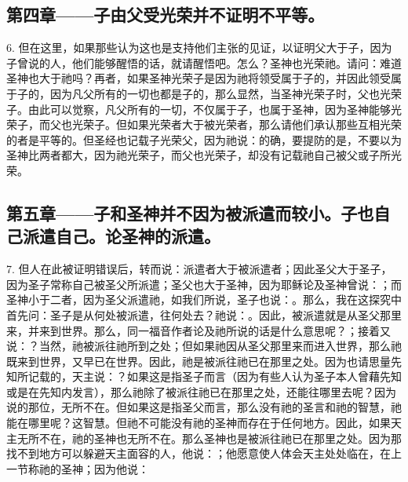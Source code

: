 
\subsection{第四章——子由父受光荣并不证明不平等。}

6. 但在这里，如果那些认为这也是支持他们主张的见证，以证明父大于子，因为子曾说的人，他们能够醒悟的话，就请醒悟吧。怎么？圣神也光荣祂。请问：难道圣神也大于祂吗？再者，如果圣神光荣子是因为祂将领受属于子的，并因此领受属于子的，因为凡父所有的一切也都是子的，那么显然，当圣神光荣子时，父也光荣子。由此可以觉察，凡父所有的一切，不仅属于子，也属于圣神，因为圣神能够光荣子，而父也光荣子。但如果光荣者大于被光荣者，那么请他们承认那些互相光荣的者是平等的。但圣经也记载子光荣父，因为祂说：的确，要提防的是，不要以为圣神比两者都大，因为祂光荣子，而父也光荣子，却没有记载祂自己被父或子所光荣。\par


\subsection{第五章——子和圣神并不因为被派遣而较小。子也自己派遣自己。论圣神的派遣。}

7. 但人在此被证明错误后，转而说：派遣者大于被派遣者；因此圣父大于圣子，因为圣子常称自己被圣父所派遣；圣父也大于圣神，因为耶稣论及圣神曾说：；而圣神小于二者，因为圣父派遣祂，如我们所说，圣子也说：。那么，我在这探究中首先问：圣子是从何处被派遣，往何处去？祂说：。因此，被派遣就是从圣父那里来，并来到世界。那么，同一福音作者论及祂所说的话是什么意思呢？；接着又说：？当然，祂被派往祂所到之处；但如果祂因从圣父那里来而进入世界，那么祂既来到世界，又早已在世界。因此，祂是被派往祂已在那里之处。因为也请思量先知所记载的，天主说：？如果这是指圣子而言（因为有些人认为圣子本人曾藉先知或是在先知内发言），那么祂除了被派往祂已在那里之处，还能往哪里去呢？因为说的那位，无所不在。但如果这是指圣父而言，那么没有祂的圣言和祂的智慧，祂能在哪里呢？这智慧。但祂不可能没有祂的圣神而存在于任何地方。因此，如果天主无所不在，祂的圣神也无所不在。那么圣神也是被派往祂已在那里之处。因为那找不到地方可以躲避天主面容的人，他说：；他愿意使人体会天主处处临在，在上一节称祂的圣神；因为他说：\par

